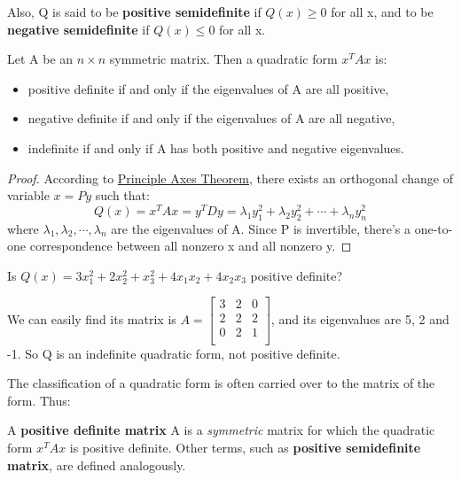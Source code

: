 Also, Q is said to be \textbf{positive semidefinite} if \(Q(x) \geq 0\) for all x, and to be \textbf{negative semidefinite} if \(Q(x) \leq 0\) for all x.    

\begin{theorem}
    Let A be an \(n \times n\) symmetric matrix. Then a quadratic form \(x^TAx\) is:
    \begin{itemize}
        \item positive definite if and only if the eigenvalues of A are all positive,
        \item negative definite if and only if the eigenvalues of A are all negative,
        \item indefinite if and only if A has both positive and negative eigenvalues.
    \end{itemize} 
\end{theorem}
\begin{proof}
    According to \hyperref[theorem: Principle Axes Theorem]{Principle Axes Theorem}, there exists an orthogonal change of variable \(x = Py\) such that:
    \[
        Q(x) = x^TAx = y^T Dy = \lambda_1 y_1^2 + \lambda_2 y_2^2 + \cdots + \lambda_n y_n^2
    \]
    where \(\lambda_1, \lambda_2, \cdots, \lambda_n\) are the eigenvalues of A. 
    Since P is invertible, there's a one-to-one correspondence between all nonzero x and all nonzero y.
\end{proof}

\begin{eg}
    Is \(Q(x) = 3x_1^2 + 2x_2^2 + x_3^2 + 4x_1x_2 + 4x_2x_3\) positive definite?

    We can easily find its matrix is \(A = \begin{bmatrix}
        3 & 2 &  0 \\
        2 & 2 &  2 \\
        0 & 2 &  1 \\
    \end{bmatrix}\), and its eigenvalues are 5, 2 and -1. So Q is an indefinite quadratic form, not positive definite. 
\end{eg}

The classification of a quadratic form is often carried over to the matrix of the form. Thus:
\begin{definition}
    A \textbf{positive definite matrix} A is a \textit{symmetric} matrix for which the quadratic form \(x^TAx\) is positive definite. Other terms, such as \textbf{positive semidefinite matrix}, are defined analogously.  
\end{definition}


